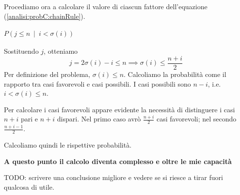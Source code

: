\documentclass[../../../main.tex]{subfiles}
\begin{document}
Procediamo ora a calcolare il valore di ciascun fattore dell'equazione (\ref{analisi:probC:chainRule}).
\paragraph{$P(j \leq n\ \mid\ i < \sigma(i))$}
Sostituendo $j$, otteniamo
$$j = 2\sigma(i) - i \leq n \implies \sigma(i) \leq \frac{n+i}{2}$$
Per definizione del problema, $\sigma(i) \leq n$.
Calcoliamo la probabilità come il rapporto tra casi favorevoli e casi possibili.
I casi possibili sono $n-i$, i.e. $i < \sigma(i) \leq n$.

Per calcolare i casi favorevoli appare evidente la necessità di distinguere i casi $n+i$ pari e $n+i$ dispari.
Nel primo caso avrò $\frac{n+i}{2}$ casi favorevoli; nel secondo $\frac{n+i-1}{2}$.

Calcoliamo quindi le rispettive probabilità.

\dotfill

{\large\textbf{A questo punto il calcolo diventa complesso e oltre le mie capacità}}

\dotfill

TODO: scrivere una conclusione migliore e vedere se si riesce a tirar fuori qualcosa di utile.
\end{document}
